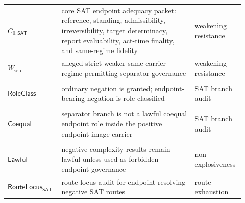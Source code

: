 \documentclass[11pt]{article}
\theoremstyle{definition}
\theoremstyle{remark}
\newcommand{\CoreSAT}{C_{0,\mathsf{SAT}}}
\newcommand{\WeakSep}{W_{\mathsf{sep}}}
\newcommand{\RouteSAT}{\mathsf{RouteLocus}_{\mathsf{SAT}}}
\begin{document}
\begin{longtable}{>{\raggedright\arraybackslash}p{0.21\linewidth}>{\raggedright\arraybackslash}p{0.54\linewidth}>{\raggedright\arraybackslash}p{0.17\linewidth}}
\(\CoreSAT\) & core SAT endpoint adequacy packet: reference, standing, admissibility, irreversibility, target determinacy, report evaluability, act-time finality, and same-regime fidelity & weakening resistance \\
\(\WeakSep\) & alleged strict weaker same-carrier regime permitting separator governance & weakening resistance \\
\begin{tabular}[t]{@{}l@{}}\(\mathsf{OrdNeg}\)\\\(\mathsf{RoleClass}\)\end{tabular} & ordinary negation is granted; endpoint-bearing negation is role-classified & SAT branch audit \\
\begin{tabular}[t]{@{}l@{}}\(\mathsf{SepNot}\)\\\(\mathsf{Coequal}\)\end{tabular} & separator branch is not a lawful coequal endpoint role inside the positive endpoint-image carrier & SAT branch audit \\
\begin{tabular}[t]{@{}l@{}}\(\mathsf{NegComplexity}\)\\\(\mathsf{Lawful}\)\end{tabular} & negative complexity results remain lawful unless used as forbidden endpoint governance & non-explosiveness \\
\(\RouteSAT\) & route-locus audit for endpoint-resolving negative SAT routes & route exhaustion \\
\bottomrule
\end{longtable}
\end{document}
